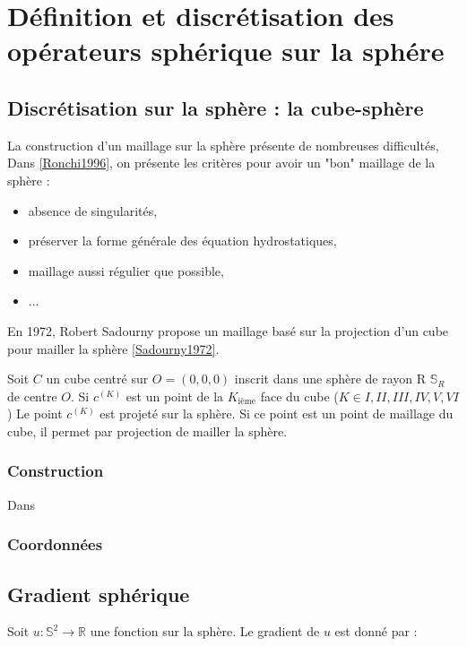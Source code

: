 
\chapter{Définition et discrétisation des opérateurs sphérique sur la sphére}

\section{Discrétisation sur la sphère : la cube-sphère}

La construction d'un maillage sur la sphère présente de nombreuses difficultés, Dans \ref{Ronchi1996}, on présente les critères pour avoir un "bon" maillage de la sphère :

\begin{itemize}
\item absence de singularités,
\item préserver la forme générale des équation hydrostatiques,
\item maillage aussi régulier que possible,
\item ...
\end{itemize}

En 1972, Robert Sadourny propose un maillage basé sur la projection d'un cube pour mailler la sphère \ref{Sadourny1972}.

Soit $C$ un cube centré sur $O=(0,0,0)$ inscrit dans une sphère de rayon R $\mathbb{S}_R$ de centre $O$.
Si $c^{(K)}$ est un point de la $K_{\text{ième}}$ face du cube ($K \in I, II, III, IV, V, VI$) 
Le point $c^{(K)}$ est projeté sur la sphère. Si ce point est un point de maillage du cube, il permet par projection de mailler la sphère. 

\subsection{Construction}

Dans 

\subsection{Coordonnées}

\section{Gradient sphérique}

Soit $u : \mathbb{S}^2 \longrightarrow \mathbb{R}$ une fonction sur la sphère. Le gradient de $u$ est donné par :

